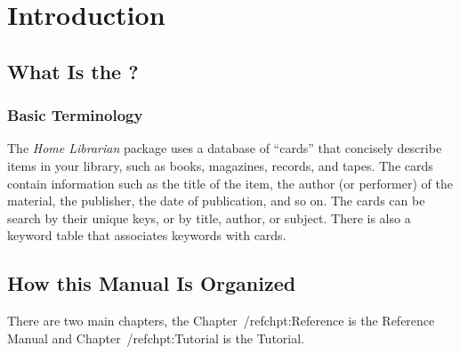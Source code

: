 \chapter{Introduction}
\label{Intro}

\section{What Is the \thesystem?}

\subsection{Basic Terminology}

The {\em Home Librarian} package uses a database of ``cards'' that
concisely describe items in your library, such as books, magazines,
records, and tapes. The cards contain information such as the title of
the item, the author (or performer) of the material, the publisher, the
date of publication, and so on. The cards can be search by their unique
keys, or by title, author, or subject.  There is also a keyword table
that associates keywords with cards.

\section{How this Manual Is Organized}

There are two main chapters, the Chapter~/ref{chpt:Reference} is the
Reference Manual and Chapter~/ref{chpt:Tutorial} is the Tutorial.


